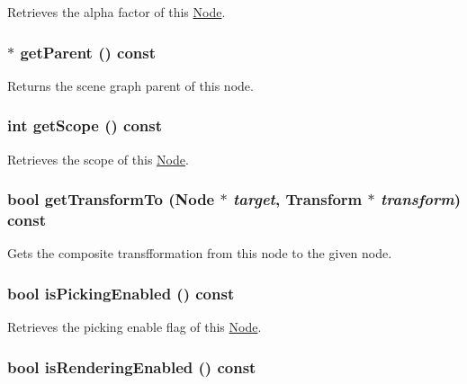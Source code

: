 Retrieves the alpha factor of this \hyperlink{classm3g_1_1Node}{Node}. \hypertarget{classm3g_1_1Node_ce26c2757f265bc6038e6818d2eb6ad9}{
\subsubsection[{getParent}]{ $\ast$ getParent () const}}
\label{classm3g_1_1Node_ce26c2757f265bc6038e6818d2eb6ad9}


Returns the scene graph parent of this node. \hypertarget{classm3g_1_1Node_a3c291c19cf805338fa4ad3c3deb663a}{
\subsubsection[{getScope}]{\setlength{\rightskip}{0pt plus 5cm}int getScope () const}}
\label{classm3g_1_1Node_a3c291c19cf805338fa4ad3c3deb663a}


Retrieves the scope of this \hyperlink{classm3g_1_1Node}{Node}. \hypertarget{classm3g_1_1Node_206a2e95eb7db42e6880414f77858113}{
\subsubsection[{getTransformTo}]{\setlength{\rightskip}{0pt plus 5cm}bool getTransformTo ({\bf Node} $\ast$ {\em target}, \/  {\bf Transform} $\ast$ {\em transform}) const}}
\label{classm3g_1_1Node_206a2e95eb7db42e6880414f77858113}


Gets the composite transfformation from this node to the given node. \hypertarget{classm3g_1_1Node_b3187e5056afa4a94af03e34125c86b1}{
\subsubsection[{isPickingEnabled}]{\setlength{\rightskip}{0pt plus 5cm}bool isPickingEnabled () const}}
\label{classm3g_1_1Node_b3187e5056afa4a94af03e34125c86b1}


Retrieves the picking enable flag of this \hyperlink{classm3g_1_1Node}{Node}. \hypertarget{classm3g_1_1Node_95020b155afed9552cc55377b09b1e86}{
\subsubsection[{isRenderingEnabled}]{\setlength{\rightskip}{0pt plus 5cm}bool isRenderingEnabled () const}}
\label{classm3g_1_1Node_95020b155afed9552cc55377b09b1e86}


